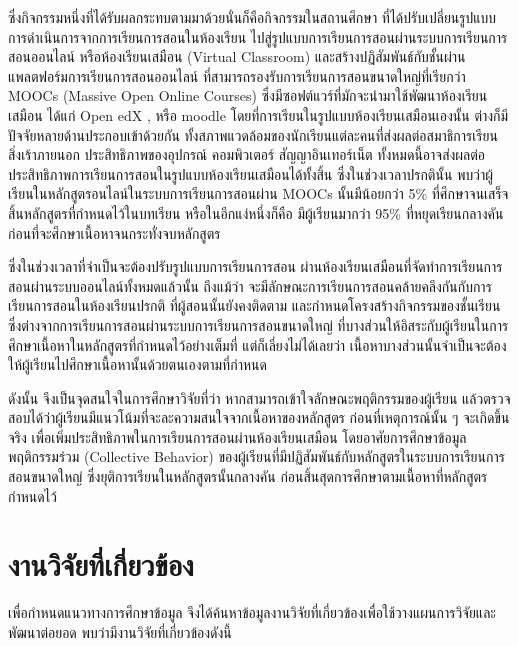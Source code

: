 \documentclass[conference]{IEEEtran}
\def\moocs{การเรียนการสอนขนาดใหญ่}
\def\MOOCs{ระบบ{\moocs}}
\begin{document}
    ซึ่งกิจกรรมหนึ่งที่ได้รับผลกระทบตามมาด้วยนั่นก็คือกิจกรรมในสถานศึกษา 
    ที่ได้ปรับเปลี่ยนรูปแบบการดำเนินการจากการเรียนการสอนในห้องเรียน 
    ไปสู่รูปแบบการเรียนการสอนผ่านระบบการเรียนการสอนออนไลน์ หรือห้องเรียนเสมือน
    (Virtual Classroom) และสร้างปฏิสัมพันธ์กับชั้นผ่านแพลตฟอร์มการเรียนการสอนออนไลน์
    ที่สามารถรองรับการเรียนการสอนขนาดใหญ่ที่เรียกว่า MOOCs (Massive Open Online Courses)
    ซึ่งมีซอฟต์แวร์ที่มักจะนำมาใช้พัฒนาห้องเรียนเสมือน ได้แก่ Open edX \cite{mooctools:openedx},
    หรือ moodle \cite{mooctools:moodle} โดยที่การเรียนในรูปแบบห้องเรียนเสมือนเองนั้น
    ต่างก็มีปัจจัยหลายด้านประกอบเข้าด้วยกัน 
    ทั้งสภาพแวดล้อมของนักเรียนแต่ละคนที่ส่งผลต่อสมาธิการเรียน สิ่งเร้าภายนอก
    ประสิทธิภาพของอุปกรณ์ คอมพิวเตอร์ สัญญาอินเทอร์เน็ต 
    ทั้งหมดนี้อาจส่งผลต่อประสิทธิภาพการเรียนการสอนในรูปแบบห้องเรียนเสมือนได้ทั้งสิ้น
    ซึ่งในช่วงเวลาปรกตินั้น พบว่าผู้เรียนในหลักสูตรอนไลน์ในระบบการเรียนการสอนผ่าน
    MOOCs นั้นมีน้อยกว่า 5\% ที่ศึกษาจนเสร็จสิ้นหลักสูตรที่กำหนดไว้ในบทเรียน \cite{Feng_Tang_Liu_2019}
    หรือในอีกแง่หนึ่งก็คือ มีผู้เรียนมากว่า 95\% 
    ที่หยุดเรียนกลางคันก่อนที่จะศึกษาเนื้อหาจนกระทั่งจบหลักสูตร

    ซึ่งในช่วงเวลาที่จำเป็นจะต้องปรับรูปแบบการเรียนการสอน 
    ผ่านห้องเรียนเสมือนที่จัดทำการเรียนการสอนผ่านระบบออนไลน์ทั้งหมดแล้วนั้น
    ถึงแม้ว่า จะมีลักษณะการเรียนการสอนคล้ายคลึงกันกับการเรียนการสอนในห้องเรียนปรกติ
    ที่ผู้สอนนั้นยังคงติดตาม และกำหนดโครงสร้างกิจกรรมของชั้นเรียน 
    ซึ่งต่างจากการเรียนการสอนผ่านระบบการเรียนการสอนขนาดใหญ่ 
    ที่บางส่วนให้อิสระกับผู้เรียนในการศึกษาเนื้อหาในหลักสูตรที่กำหนดไว้อย่างเต็มที่ 
    แต่ก็เลี่ยงไม่ได้เลยว่า เนื้อหาบางส่วนนั้นจำเป็นจะต้องให้ผู้เรียนไปศึกษาเนื้อหานั้นด้วยตนเองตามที่กำหนด
    
    ดังนั้น จึงเป็นจุดสนใจในการศึกษาวิจัยที่ว่า หากสามารถเข้าใจลักษณะพฤติกรรมของผู้เรียน
    แล้วตรวจสอบได้ว่าผู้เรียนมีแนวโน้มที่จะละความสนใจจากเนื้อหาของหลักสูตร
    ก่อนที่เหตุการณ์นั้น ๆ จะเกิดขึ้นจริง เพื่อเพิ่มประสิทธิภาพในการเรียนการสอนผ่านห้องเรียนเสมือน
    โดยอาศัยการศึกษาข้อมูลพฤติกรรมร่วม (Collective Behavior) 
    \cite{mooc:collectivebehavior} ของผู้เรียนที่มีปฏิสัมพันธ์กับหลักสูตรใน{\MOOCs} 
    ซึ่งยุติการเรียนในหลักสูตรนั้นกลางคัน ก่อนสิ้นสุดการศึกษาตามเนื้อหาที่หลักสูตรกำหนดไว้

    \section{งานวิจัยที่เกี่ยวข้อง}

    เพื่อกำหนดแนวทางการศึกษาข้อมูล 
    จึงได้ค้นหาข้อมูลงานวิจัยที่เกี่ยวข้องเพื่อใช้วางแผนการวิจัยและพัฒนาต่อยอด 
    พบว่ามีงานวิจัยที่เกี่ยวข้องดังนี้
\end{document}
